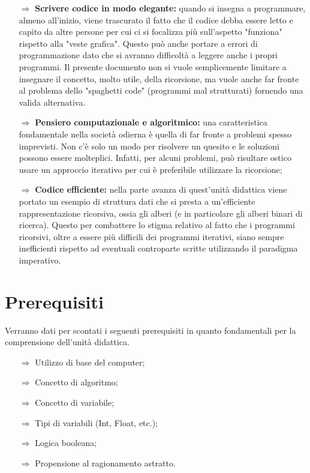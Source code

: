 \begin{itemize}
    \item [$\Rightarrow$] \textbf{Scrivere codice in modo elegante:} quando si insegna
    a programmare, almeno all'inizio, viene trascurato il fatto che il codice debba essere
    letto e capito da altre persone per cui ci si focalizza più sull'aspetto "funziona" rispetto
    alla "veste grafica". Questo può anche portare a errori di programmazione dato che si avranno
    difficoltà a leggere anche i propri programmi. Il presente documento non si vuole semplicemente
    limitare a insegnare il concetto, molto utile, della ricorsione, ma vuole anche far fronte al
    problema dello "spaghetti code" (programmi mal strutturati) fornendo una valida alternativa.
    \item [$\Rightarrow$] \textbf{Pensiero computazionale e algoritmico:} una caratteristica fondamentale
    nella società odierna è quella di far fronte a problemi spesso imprevisti. Non c'è solo un modo per
    risolvere un quesito e le soluzioni possono essere molteplici. Infatti, per alcuni problemi, può
    risultare ostico usare un approccio iterativo per cui è preferibile utilizzare la ricorsione;
    \item [$\Rightarrow$] \textbf{Codice efficiente:} nella parte avanza di quest'unità didattica viene
    portato un esempio di struttura dati che si presta a un'efficiente rappresentazione ricorsiva, ossia
    gli alberi (e in particolare gli alberi binari di ricerca). Questo per combattere lo stigma
    relativo al fatto che i programmi ricorsivi, oltre a essere più difficili dei programmi iterativi, siano 
    sempre inefficienti rispetto ad eventuali controparte scritte utilizzando il paradigma imperativo.
\end{itemize}

\section{Prerequisiti}

Verranno dati per scontati i seguenti prerequisiti in quanto fondamentali per la comprensione dell'unità didattica.

\begin{itemize}
    \item [$\Rightarrow$] Utilizzo di base del computer;
    \item [$\Rightarrow$] Concetto di algoritmo;
    \item [$\Rightarrow$] Concetto di variabile;
    \item [$\Rightarrow$] Tipi di variabili (Int, Float, etc.);
    \item [$\Rightarrow$] Logica booleana;
    \item [$\Rightarrow$] Propensione al ragionamento astratto.
\end{itemize}
